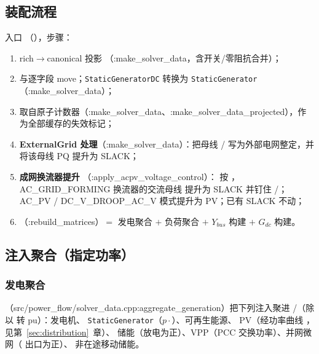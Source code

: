 \subsection{装配流程}
入口 
（），步骤：
\begin{enumerate}
  \item rich$\to$canonical 投影 
        （:make\_solver\_data，含开关/零阻抗合并）；
  \item {} 与逐字段 move；\texttt{StaticGeneratorDC}
        转换为 \texttt{StaticGenerator}（:make\_solver\_data）；
  \item {} 取自原子计数器（:make\_solver\_data、:make\_solver\_data\_projected），作为全部缓存的失效标记；
  \item \textbf{ExternalGrid 处理}（:make\_solver\_data）：把母线 /
        写为外部电网整定，并将该母线 PQ 提升为 SLACK；
  \item \textbf{成网换流器提升} （:apply\_acpv\_voltage\_control）：
        按 ，AC\_GRID\_FORMING 换流器的交流母线
        提升为 SLACK 并钉住 /；
        AC\_PV / DC\_V\_DROOP\_AC\_V 模式提升为 PV；已有 SLACK 不动；
  \item {}（:rebuild\_matrices）$=$ 发电聚合 $+$ 负荷聚合 $+$
        $Y_{bus}$ 构建 $+$ $G_{dc}$ 构建。
\end{enumerate}

\subsection{注入聚合（指定功率）}
\subsubsection*{发电聚合}
（src/power\_flow/solver\_data.cpp:aggregate\_generation）把下列注入聚进
/（除以  转 pu）：发电机、
\texttt{StaticGenerator}（$p\cdot$）、可再生能源、
PV（经功率曲线 ，见第~\ref{sec:distribution}~章）、
储能（放电为正）、VPP（PCC 交换功率）、并网微网（ 出口为正）、
非在途移动储能。

